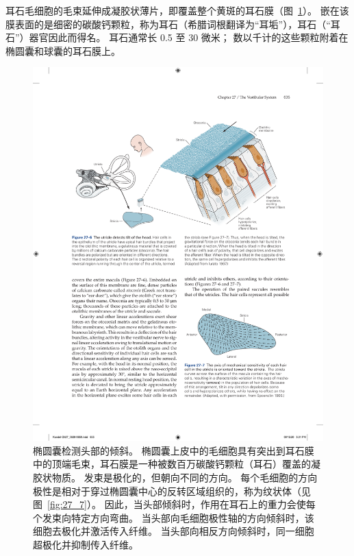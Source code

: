 耳石毛细胞的毛束延伸成凝胶状薄片，即覆盖整个黄斑的耳石膜（图~\ref{fig:27_6}）。
嵌在该膜表面的是细密的碳酸钙颗粒，称为耳石（希腊词根翻译为“耳垢”），耳石（“耳石”）器官因此而得名。
耳石通常长 0.5 至 30 微米；
数以千计的这些颗粒附着在椭圆囊和球囊的耳石膜上。


\begin{figure}[htbp]
	\centering
	\includegraphics[width=0.9\linewidth]{chap27/fig_27_6}
	\caption{椭圆囊检测头部的倾斜。
		椭圆囊上皮中的毛细胞具有突出到耳石膜中的顶端毛束，耳石膜是一种被数百万碳酸钙颗粒（耳石）覆盖的凝胶状物质。
		发束是极化的，但朝向不同的方向。
		每个毛细胞的方向极性是相对于穿过椭圆囊中心的反转区域组织的，称为纹状体（见图~\ref{fig:27_7}）。
		因此，当头部倾斜时，作用在耳石上的重力会使每个发束向特定方向弯曲。
		当头部向毛细胞极性轴的方向倾斜时，该细胞去极化并激活传入纤维。
		当头部向相反方向倾斜时，同一细胞超极化并抑制传入纤维\cite{iurato2013submicroscopic}。}
	\label{fig:27_6}
\end{figure}



